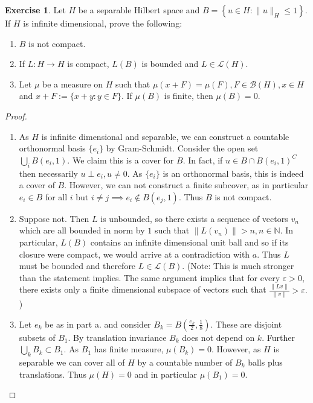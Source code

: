 \documentclass{amsart}
\theoremstyle{plain}
\theoremstyle{definition}
\newtheorem{exer}{Exercise}[section]
\newcommand{\N}{\mathbb{N}}
\begin{document}
\begin{exer}
    Let $H$ be a separable Hilbert space and $B = \left\{u\in H: \|u\|_{H} \leq 1\right\}.$ If $H$ is infinite dimensional, prove the following:
    \begin{enumerate}[label=\alph*.]
        \item $B$ is not compact. 
        \item If $L:H\to H$ is compact, $L(B)$ is bounded and $L\in \mathcal{L}(H).$
        \item Let $\mu$ be a measure on $H$ such that $\mu\left(x+F\right) = \mu(F) , F\in \mathcal{B}(H), x\in H$ and $x+F:= \{x+y : y\in F
        \}.$ If $\mu(B)$ is finite, then $\mu(B) = 0.$
    \end{enumerate}
\end{exer}
\begin{proof}
\begin{enumerate}[label=\alph*.]
    \item As $H$ is infinite dimensional and separable, we can construct a countable orthonormal basis $\{e_i\}$ by Gram-Schmidt. Consider the open set $\bigcup_{i} B(e_{i},1).$ We claim this is a cover for $B.$ In fact, if $u\in B\cap B(e_{i},1)^{C}$ then necessarily $u\perp e_i,u\neq 0.$ As $\{e_i\}$ is an orthonormal basis, this is indeed a cover of $B$. However, we can not construct a finite subcover, as in particular $e_i \in B$ for all $i$ but $i\neq j \implies e_i \not \in B(e_j,1).$ Thus $B$ is not compact.  
    \item Suppose not. Then $L$ is unbounded, so there exists a sequence of vectors $v_n$ which are all bounded in norm by $1$ such that $\|L(v_n)\| > n , n\in \N.$ In particular, $L(B)$ contains an infinite dimensional unit ball and so if its closure were compact, we would arrive at a contradiction with $a.$ Thus $L$ must be bounded and therefore $L\in \mathcal{L}(B).$ (Note: This is much stronger than the statement implies. The same argument implies that for every $\varepsilon >0$, there exists only a finite dimensional subspace of vectors such that $\frac{\|Lv\|}{\|v\|}>\varepsilon.$)
    \item Let $e_k$ be as in part a. and consider $B_k=B\left(\frac{e_k}{2}, \frac{1}{8}\right).$ These are disjoint subsets of $B_1$. By translation invariance $B_k$ does not depend on $k$. Further $\bigcup_{k} B_k \subset B_1$. As $B_1$ has finite measure, $\mu(B_k) = 0$. However, as $H$ is separable we can cover all of $H$ by a countable number of $B_k$ balls plus translations. Thus $\mu(H) = 0$ and in particular $\mu(B_1) = 0.$
\end{enumerate}
\end{proof}
\end{document}
